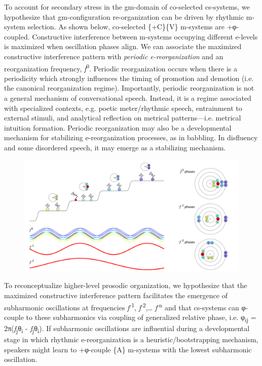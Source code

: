   To account for secondary stress in the gm-domain of co-selected cs-systems, we hypothesize that gm-configuration re-organization can be driven by rhythmic m-system selection. As shown below, co-selected \{+C\}\{V\} m-systems are +φ-coupled. Constructive interference between m-systems occupying different e-levels is maximized when oscillation phases align. We can associate the maximized constructive interference pattern with \textit{periodic e-reorganization} and an reorganization frequency, \textit{f}\textsuperscript{0}. Periodic reorganization occurs when there is a periodicity which strongly influences the timing of promotion and demotion (i.e. the canonical reorganization regime). Importantly, periodic reorganization is not a general mechanism of conversational speech. Instead, it is a regime associated with specialized contexts, e.g. poetic meter/rhythmic speech, entrainment to external stimuli, and analytical reflection on metrical patterns—i.e. metrical intuition formation. Periodic reorganization may also be a developmental mechanism for stabilizing e-reorganization processes, as in babbling. In disfluency and some disordered speech, it may emerge as a stabilizing mechanism.

  
\begin{figure}
\includegraphics[width=\textwidth]{figures/Tilsen-img64.png}
\caption{\missingcaption}
\label{fig:}
\end{figure}
 

  To reconceptualize higher-level prosodic organization, we hypothesize that the maximized constructive interference pattern facilitates the emergence of subharmonic oscillations at frequencies \textit{f}\textsuperscript{{}-1}, \textit{f}\textsuperscript{{}-2},… \textit{f}\textsuperscript{{}-n} and that cs-systems can φ-couple to these subharmonics via coupling of generalized relative phase, i.e. φ\textsubscript{ij} = 2π(\textit{f}\textsubscript{j}θ\textsubscript{i} - \textit{f}\textsubscript{j}θ\textsubscript{i}). If subharmonic oscillations are influential during a developmental stage in which rhythmic e-reorganization is a heuristic/bootstrapping mechanism, speakers might learn to +φ-couple \{A\} m-systems with the lowest subharmonic oscillation.

